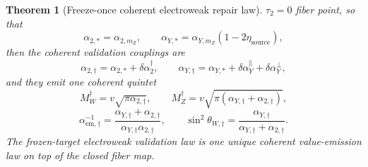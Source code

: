 \documentclass[11pt]{article}
\newtheorem{theorem}{Theorem}[section]
\begin{document}
\begin{theorem}[Freeze-once coherent electroweak repair law]
\(\tau_2=0\) fiber point, so that
\[
\alpha_{2,*}=\alpha_{2,m_Z},
\qquad
\alpha_{Y,*}=\alpha_{Y,m_Z}(1-2\eta_{\mathrm{source}}),
\]
then the coherent validation couplings are
\[
\alpha_{2,\dagger}=\alpha_{2,*}+\delta\alpha_2^\dagger,
\qquad
\alpha_{Y,\dagger}=\alpha_{Y,*}+\delta\alpha_Y^\parallel+\delta\alpha_Y^\perp,
\]
and they emit one coherent quintet
\[
M_W^\dagger=v\sqrt{\pi\alpha_{2,\dagger}},
\qquad
M_Z^\dagger=v\sqrt{\pi(\alpha_{Y,\dagger}+\alpha_{2,\dagger})},
\]
\[
\alpha_{\mathrm{em},\dagger}^{-1}
=
\frac{\alpha_{Y,\dagger}+\alpha_{2,\dagger}}
{\alpha_{Y,\dagger}\alpha_{2,\dagger}},
\qquad
\sin^2\theta_{W,\dagger}
=
\frac{\alpha_{Y,\dagger}}{\alpha_{Y,\dagger}+\alpha_{2,\dagger}}.
\]
The frozen-target electroweak validation law is one unique coherent value-emission law on top of
the closed fiber map.
\end{theorem}
\end{document}
